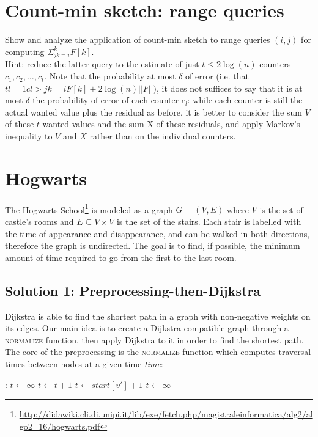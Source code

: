 \documentclass{article}
\begin{document}
\newpage
\section{Count-min sketch: range queries}

Show and analyze the application of count-min sketch to range queries $(i, j)$ for
computing $\Sigma_{jk=i}^{k} F[k]$.\\
Hint: reduce the latter query to the estimate of just $t \leq 2 \log(n)$ counters
$c_1, c_2, \dots, c_t$.
Note that the probability at most $\delta$ of error (i.e. that $tl = 1 c l > jk = i F[k] + 2 \log(n) ||F||)$,
it does not suffices to say that it is at most $\delta$ the probability of error
of each counter $c_l$: while each counter is still the actual wanted value plus
the residual as before, it is better to consider the sum $V$ of these $t$ wanted
values and the sum X of these residuals, and apply Markov’s inequality to $V$ and
$X$ rather than on the individual counters.


\newpage
\newpage
\section{Hogwarts}

The Hogwarts School\footnote{\url{http://didawiki.cli.di.unipi.it/lib/exe/fetch.php/magistraleinformatica/alg2/algo2_16/hogwarts.pdf}}
is modeled as a graph $G=(V, E)$ where $V$ is the set of castle's rooms and $E \subseteq V \times V$
is the set of the stairs.
Each stair is labelled with the time of appearance and disappearance, and can be
walked in both directions, therefore the graph is undirected.
The goal is to find, if possible, the minimum amount of time required to go from
the first to the last room.

\subsection{Solution 1: Preprocessing-then-Dijkstra}

Dijkstra is able to find the shortest path in a graph with non-negative weights
on its edges.
Our main idea is to create a Dijkstra compatible graph through a \textsc{normalize}
function, then apply Dijkstra to it in order to find the shortest path.
The core of the preprocessing is the \textsc{normalize} function which computes traversal
times between nodes at a given time \emph{time}:

\begin{algorithmic}[1]
  :
    \State $t \gets \infty$
      
      \State $t \gets t + 1$
                
      \State $t \gets start[v'] + 1$
    \Else
      \State $t \gets \infty$          
    \EndIf
      \State {}
    \EndFunction
\end{algorithmic}
\end{document}
